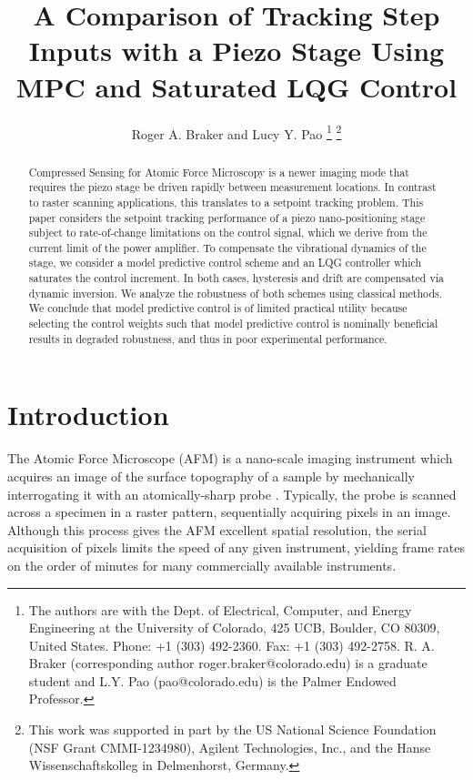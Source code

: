 \documentclass[twocolumn,twoside]{IEEEtran}
\begin{document}
\title{A Comparison of Tracking Step Inputs with a Piezo Stage Using MPC and Saturated LQG Control}
\author{Roger A. Braker and Lucy Y. Pao
  \thanks{The authors are with the Dept. of Electrical, Computer, and Energy Engineering at the University of Colorado, 425 UCB, Boulder, CO 80309, United States. Phone: +1 (303) 492-2360. Fax: +1 (303) 492-2758.
    R. A.  Braker (corresponding author roger.braker@colorado.edu) is a graduate student and
    L.Y. Pao (pao@colorado.edu) is the Palmer Endowed Professor.}
  \thanks{This work was supported in part by the US National Science Foundation (NSF Grant CMMI-1234980), Agilent Technologies, Inc., and the Hanse Wissenschaftskolleg in Delmenhorst, Germany.}
}

\maketitle
\begin{abstract}
  Compressed Sensing for Atomic Force Microscopy is a newer imaging mode that requires the piezo stage be driven rapidly between measurement locations. In contrast to raster scanning applications, this translates to a setpoint tracking problem. 
  This paper considers the setpoint tracking performance of a piezo nano-positioning stage subject to rate-of-change limitations on the control signal, which we derive from the current limit of the power amplifier.
To compensate the vibrational dynamics of the stage, we consider a model predictive control scheme and an LQG controller which saturates the control increment. In both cases, hysteresis and drift are compensated via dynamic inversion. We analyze the robustness of both schemes using classical methods. We conclude that model predictive control is of limited practical utility because selecting the control weights such that model predictive control is nominally beneficial results in degraded robustness, and thus in poor experimental performance.
\end{abstract}


\section{Introduction}\label{sec:intro}
The Atomic Force Microscope (AFM) is a nano-scale imaging instrument which acquires an image of the surface topography of a sample by mechanically interrogating it with an atomically-sharp probe \cite{abramovitch_tutorial_2007, rana_improvement_survey_2017}. Typically, the probe is scanned across a specimen in a raster pattern, sequentially acquiring pixels in an image. Although this process gives the AFM excellent spatial resolution, the serial acquisition of pixels limits the speed of any given instrument, yielding frame rates on the order of minutes for many commercially available instruments.
\end{document}
